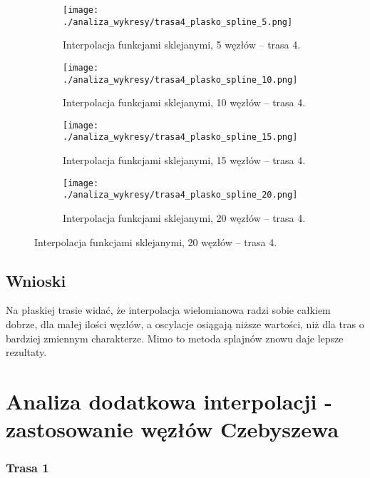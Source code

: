 \documentclass[a4paper,12pt]{article}
\begin{document}
\begin{figure}[H]
    \centering
    \begin{subfigure}{0.45\textwidth}
        \centering
        \texttt{[image: ./analiza\_wykresy/trasa4\_plasko\_spline\_5.png]}
        \caption{Interpolacja funkcjami sklejanymi, 5 węzłów – trasa 4.}
    \end{subfigure}\hfill
    \begin{subfigure}{0.45\textwidth}
        \centering
        \texttt{[image: ./analiza\_wykresy/trasa4\_plasko\_spline\_10.png]}
        \caption{Interpolacja funkcjami sklejanymi, 10 węzłów – trasa 4.}
    \end{subfigure}
    
    \vspace{0.5cm}
    
    \begin{subfigure}{0.45\textwidth}
        \centering
        \texttt{[image: ./analiza\_wykresy/trasa4\_plasko\_spline\_15.png]}
        \caption{Interpolacja funkcjami sklejanymi, 15 węzłów – trasa 4.}
    \end{subfigure}\hfill
    \begin{subfigure}{0.45\textwidth}
        \centering
        \texttt{[image: ./analiza\_wykresy/trasa4\_plasko\_spline\_20.png]}
        \caption{Interpolacja funkcjami sklejanymi, 20 węzłów – trasa 4.}
    \end{subfigure}
\end{figure}
\subsection{Wnioski}
Na płaskiej trasie widać, że interpolacja wielomianowa radzi sobie całkiem dobrze, dla małej ilości węzłów, a oscylacje osiągają niższe wartości, niż dla tras o bardziej zmiennym charakterze. Mimo to metoda splajnów znowu daje lepsze rezultaty.

\section{Analiza dodatkowa interpolacji - zastosowanie węzłów Czebyszewa}

\subsubsection{Trasa 1}
\end{document}
